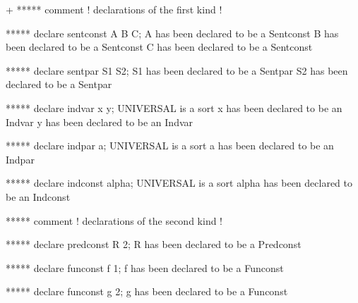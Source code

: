 



\gfexample+
   ***** comment ! declarations of the first kind !

   ***** declare sentconst A B C;
   A has been declared to be a Sentconst
   B has been declared to be a Sentconst
   C has been declared to be a Sentconst

   ***** declare sentpar S1 S2;
   S1 has been declared to be a Sentpar
   S2 has been declared to be a Sentpar

   ***** declare indvar x y;
   UNIVERSAL is a sort
   x has been declared to be an Indvar
   y has been declared to be an Indvar

   ***** declare indpar a;
   UNIVERSAL is a sort
   a has been declared to be an Indpar

   ***** declare indconst alpha;
   UNIVERSAL is a sort
   alpha has been declared to be an Indconst

   ***** comment ! declarations of the second kind !
   
   ***** declare predconst R 2;
   R has been declared to be a Predconst
   
   ***** declare funconst f 1;
   f has been declared to be a Funconst
   
   ***** declare funconst g 2;
   g has been declared to be a Funconst
   
